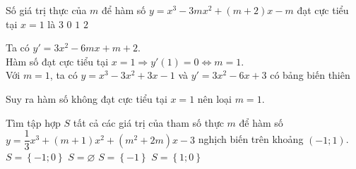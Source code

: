 \begin{ex}%
Số giá trị thực của $m$ để hàm số $y=x^3-3m x^2+(m+2)x-m$ đạt cực tiểu tại $x=1$ là
\choice
{$3$}
{\True $0$}
{$1$}
{$2$}
\loigiai
{
Ta có $y'=3x^2-6mx+m+2$.\\
Hàm số đạt cực tiểu tại $x=1\Rightarrow y'(1)=0\Leftrightarrow m=1$.\\
Với $m=1$, ta có $y=x^3-3x^2+3x-1$ và $y'=3x^2-6x+3$ có bảng biến thiên
\begin{center}
\end{center}
Suy ra hàm số không đạt cực tiểu tại $x=1$ nên loại $m=1$.
}
\end{ex}

\begin{ex}%
Tìm tập hợp $S$ tất cả các giá trị của tham số thực $m$ để hàm số $y=\dfrac{1}{3}x^3 + (m + 1)x^2 + \left(m^2 + 2m\right)x - 3$ nghịch biến trên khoảng $(- 1; 1)$.
\choice
{$S=\left\{- 1; 0\right\}$}
{$S=\varnothing $}
{\True $S=\left\{- 1\right\}$}
{$S=\left\{1; 0\right\}$}
\end{ex}

